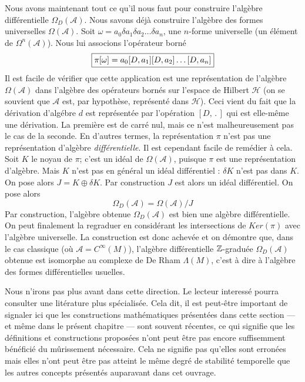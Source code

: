 Nous avons maintenant tout ce qu'il nous faut pour construire l'alg\`ebre 
diff\'erentielle $\Omega_{D}({\mathcal A})$.  Nous savons d\'ej\`a 
construire l'alg\`ebre des formes universelles $\Omega({\mathcal A})$. 
Soit $\omega = a_{0}\delta a_{1}\delta a_{2}\ldots \delta a_{n}$, une $n$-forme 
universelle (un \'el\'ement de $\Omega^n({\mathcal A})$). Nous lui 
associons l'op\'erateur born\'e  $$
\mbox{\fbox{$
\pi[\omega] = a_{0}[D,a_{1}][D,a_{2}]\ldots [D,a_{n}]
$}}
$$
Il est facile de v\'erifier que cette application est une repr\'esentation 
de l'alg\`ebre $\Omega({\mathcal A})$ dans l'alg\`ebre des op\'erateurs 
born\'es sur l'espace de Hilbert ${\mathcal H}$ (on se souvient que ${\mathcal 
A}$ est, par hypoth\`ese, repr\'esent\'e dans ${\mathcal H}$). Ceci vient 
du fait que la d\'erivation d'alg\'ebre $d$ est repr\'esent\'ee par l'op\'eration 
$[D,\,.\,]$ qui est elle-m\^eme une d\'erivation. 
La premi\`ere est de carr\'e nul, mais ce n'est malheureusement pas le cas 
de la seconde. En d'autres termes, la repr\'esentation $\pi$ n'est pas 
une repr\'esentation d'alg\`ebre {\it diff\'erentielle\/}. Il est cependant 
facile de rem\'edier \`a cela. Soit $K$ le noyau de $\pi$; c'est un id\'eal 
de $\Omega({\mathcal A})$, puisque $\pi$ est une repr\'esentation 
d'alg\`ebre. Mais $K$ n'est pas en g\'en\'eral un id\'eal diff\'erentiel : $\delta K$ 
n'est pas dans $K$. On pose alors $J  =  K \oplus \delta K$. Par 
construction $J$ est alors un id\'eal diff\'erentiel. On pose alors
$$ 
\Omega_{D}({\mathcal A})   =  \Omega({\mathcal A}) / J
$$
Par construction, l'alg\`ebre obtenue $\Omega_{D}({\mathcal A})$ est bien une alg\`ebre 
diff\'erentielle. On peut finalement la regraduer en consid\'erant les 
intersections de $Ker(\pi)$ avec l'alg\`ebre universelle.
La construction est donc achev\'ee et on d\'emontre que, dans le cas classique 
(o\`u ${\mathcal A} = C^\infty(M)$), l'alg\`ebre diff\'erentielle 
$\mathbb{Z}$-gradu\'ee $\Omega_{D}({\mathcal A}) $ obtenue est isomorphe au complexe de De Rham $\Lambda(M)$, c'est \`a dire 
\`a l'alg\`ebre des formes diff\'erentielles usuelles.

Nous n'irons pas plus avant dans cette direction. Le lecteur interess\'e 
pourra consulter une lit\'erature plus sp\'ecialis\'ee. Cela dit, il est 
peut-\^etre important de signaler ici que les constructions math\'ematiques 
pr\'esent\'ees dans cette section --- et m\^eme dans le pr\'esent chapitre --- 
sont souvent r\'ecentes, ce qui signifie que les d\'efinitions et 
constructions propos\'ees n'ont peut \^etre pas encore suffisemment b\'en\'efici\'e 
du m\^urissement n\'ecessaire. 
Cela ne signifie pas qu'elles sont erron\'ees mais elles n'ont peut \^etre
pas atteint le m\^eme degr\'e de stabilit\'e temporelle que les autres concepts 
pr\'esent\'es auparavant dans cet ouvrage.

